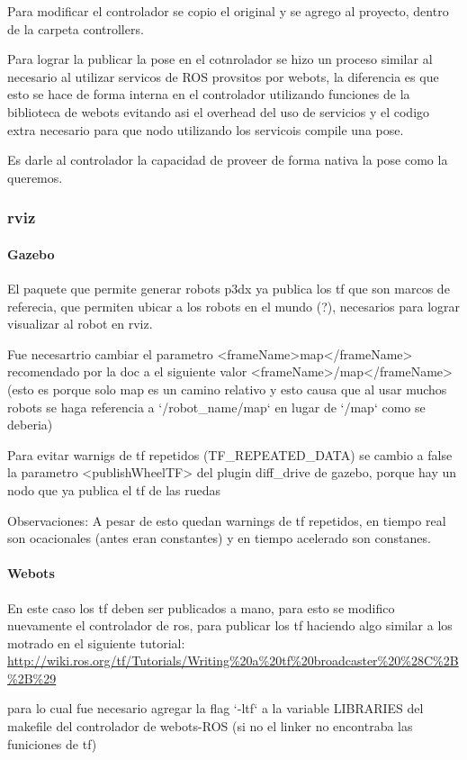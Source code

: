 Para modificar el controlador se copio el original y se agrego al proyecto, dentro de la carpeta controllers.

Para lograr la publicar la pose en el cotnrolador se hizo un proceso similar al necesario al utilizar servicos de ROS provsitos por webots, la diferencia es que esto se hace de forma interna en el controlador utilizando funciones de la biblioteca de webots evitando asi el overhead del uso de servicios  y el codigo extra necesario para que nodo utilizando los servicois compile una pose.

Es darle al controlador la capacidad de proveer de forma nativa la pose como la queremos.

\subsubsection{rviz}
\paragraph{Gazebo}
El paquete que permite generar robots p3dx ya publica los tf que son marcos de referecia, que permiten ubicar a los robots en el mundo (?), necesarios para lograr visualizar al robot en rviz.

Fue necesartrio cambiar el parametro <frameName>map</frameName> recomendado por la doc a el siguiente valor <frameName>/map</frameName> (esto es porque solo map es un camino relativo y esto causa que al usar muchos robots se haga referencia a `/robot\_name/map` en lugar de `/map` como se deberia)

Para evitar warnigs de tf repetidos (TF\_REPEATED\_DATA) se cambio a false la parametro	<publishWheelTF>  del plugin diff\_drive de gazebo, porque hay un nodo que ya publica el tf de las ruedas

Observaciones: A pesar de esto quedan warnings de tf repetidos, en tiempo real son ocacionales (antes eran constantes) y en tiempo acelerado son constanes.

\paragraph{Webots}
En este caso los tf deben ser publicados a mano, para esto se modifico nuevamente el controlador de ros, para publicar los tf haciendo algo similar a los motrado en el siguiente tutorial:
\url{http://wiki.ros.org/tf/Tutorials/Writing%20a%20tf%20broadcaster%20%28C%2B%2B%29}

para lo cual fue necesario agregar la flag `-ltf` a la variable LIBRARIES del makefile del controlador de webots-ROS (si no el linker no encontraba las funiciones de tf)

